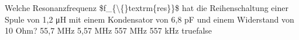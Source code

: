     {Welche Resonanzfrequenz \$f\_\{\textbackslash\{\}textrm\{res\}\}\$ hat die Reihenschaltung einer Spule von 1,2 μH mit einem Kondensator von 6,8 pF und einem Widerstand von 10 Ohm?}
    {55,7 MHz}
    {5,57 MHz}
    {557 MHz}
    {557 kHz}
    {true}{false}